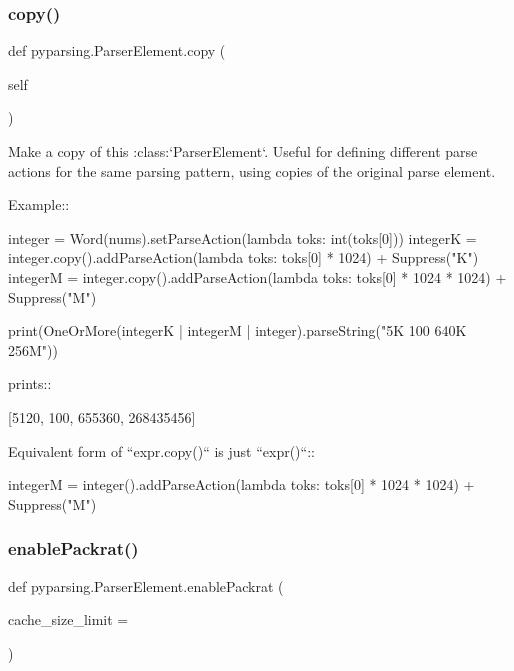 \mbox{\label{classpyparsing_1_1ParserElement_a1fc11c0465d31bf37eb92f7a5cd8c6a4}} 
\subsubsection{\texorpdfstring{copy()}{copy()}}
{\footnotesize\ttfamily def pyparsing.\+Parser\+Element.\+copy (\begin{DoxyParamCaption}\item[{}]{self }\end{DoxyParamCaption})}

\begin{DoxyVerb}Make a copy of this :class:`ParserElement`.  Useful for defining
different parse actions for the same parsing pattern, using copies of
the original parse element.

Example::

    integer = Word(nums).setParseAction(lambda toks: int(toks[0]))
    integerK = integer.copy().addParseAction(lambda toks: toks[0] * 1024) + Suppress("K")
    integerM = integer.copy().addParseAction(lambda toks: toks[0] * 1024 * 1024) + Suppress("M")

    print(OneOrMore(integerK | integerM | integer).parseString("5K 100 640K 256M"))

prints::

    [5120, 100, 655360, 268435456]

Equivalent form of ``expr.copy()`` is just ``expr()``::

    integerM = integer().addParseAction(lambda toks: toks[0] * 1024 * 1024) + Suppress("M")
\end{DoxyVerb}
 \mbox{\label{classpyparsing_1_1ParserElement_a86772c01db5d9a951c955c9028946d46}} 
\subsubsection{\texorpdfstring{enable\+Packrat()}{enablePackrat()}}
{\footnotesize\ttfamily def pyparsing.\+Parser\+Element.\+enable\+Packrat (\begin{DoxyParamCaption}\item[{}]{cache\+\_\+size\+\_\+limit = {} }\end{DoxyParamCaption})\hspace{0.3cm}{\ttfamily [static]}}

